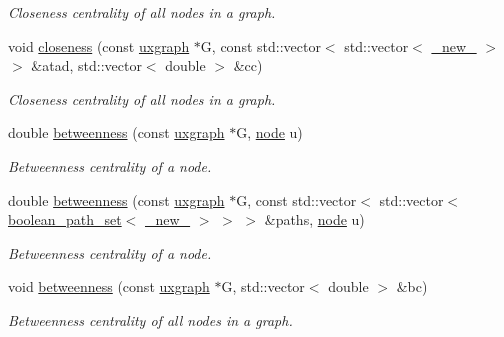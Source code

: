 \begin{DoxyCompactItemize}
\begin{DoxyCompactList}\small\item\em Closeness centrality of all nodes in a graph. \end{DoxyCompactList}\item 
void \hyperlink{namespacelgraph_1_1networks_1_1metrics_1_1centralities_a56d2d61c30688914a57cc7a55733582d}{closeness} (const \hyperlink{classlgraph_1_1uxgraph}{uxgraph} $\ast$G, const std\-::vector$<$ std\-::vector$<$ \hyperlink{namespacelgraph_a2836f966c1c36b43da337d8907728ec0}{\-\_\-new\-\_\-} $>$ $>$ \&atad, std\-::vector$<$ double $>$ \&cc)
\begin{DoxyCompactList}\small\item\em Closeness centrality of all nodes in a graph. \end{DoxyCompactList}\item 
double \hyperlink{namespacelgraph_1_1networks_1_1metrics_1_1centralities_a0834cb72864b1bdf574c212c5cafbce9}{betweenness} (const \hyperlink{classlgraph_1_1uxgraph}{uxgraph} $\ast$G, \hyperlink{namespacelgraph_a397169dd66adf725210a30fb7251773e}{node} u)
\begin{DoxyCompactList}\small\item\em Betweenness centrality of a node. \end{DoxyCompactList}\item 
double \hyperlink{namespacelgraph_1_1networks_1_1metrics_1_1centralities_a9c5f210ed96ff6bcb1dfb45aaba3f947}{betweenness} (const \hyperlink{classlgraph_1_1uxgraph}{uxgraph} $\ast$G, const std\-::vector$<$ std\-::vector$<$ \hyperlink{namespacelgraph_afad432931ba600ab1628d5c9595986c5}{boolean\-\_\-path\-\_\-set}$<$ \hyperlink{namespacelgraph_a2836f966c1c36b43da337d8907728ec0}{\-\_\-new\-\_\-} $>$ $>$ $>$ \&paths, \hyperlink{namespacelgraph_a397169dd66adf725210a30fb7251773e}{node} u)
\begin{DoxyCompactList}\small\item\em Betweenness centrality of a node. \end{DoxyCompactList}\item 
void \hyperlink{namespacelgraph_1_1networks_1_1metrics_1_1centralities_a9bc71e78d93bb18cd0b6d69c7c88da8a}{betweenness} (const \hyperlink{classlgraph_1_1uxgraph}{uxgraph} $\ast$G, std\-::vector$<$ double $>$ \&bc)
\begin{DoxyCompactList}\small\item\em Betweenness centrality of all nodes in a graph. \end{DoxyCompactList}\item 

\end{DoxyCompactItemize}
